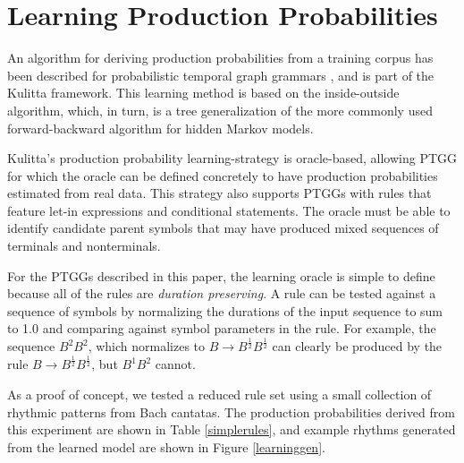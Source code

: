 \documentclass{article}
\begin{document}
\section{Learning Production Probabilities}

An algorithm for deriving production probabilities from a training corpus has been described for probabilistic temporal graph grammars \cite{kulitta_learning}, and is part of the Kulitta framework. This learning method is based on the inside-outside algorithm\cite{lari1990}, which, in turn, is a tree generalization of the more commonly used forward-backward algorithm for hidden Markov models.

Kulitta's production probability learning-strategy is oracle-based, allowing PTGG for which the oracle can be defined concretely to have production probabilities estimated from real data. This strategy also supports PTGGs with rules that feature let-in expressions and conditional statements. The oracle must be able to identify candidate parent symbols that may have produced mixed sequences of terminals and nonterminals. 

For the PTGGs described in this paper, the learning oracle is simple to define because all of the rules are \emph{duration preserving}. A rule can be tested against a sequence of symbols by normalizing the durations of the input sequence to sum to 1.0 and comparing against symbol parameters in the rule. For example, the sequence $B^{2}B^{2}$, which normalizes to $B \rightarrow B^\frac{1}{2} B^\frac{1}{2}$ can clearly be produced by the rule $B \rightarrow B^\frac{1}{2} B^\frac{1}{2}$, but $B^{1} B^{2}$ cannot. 

As a proof of concept, we tested a reduced rule set using a small collection of rhythmic patterns from Bach cantatas. The production probabilities derived from this experiment are shown in Table \ref{simplerules}, and example rhythms generated from the learned model are shown in Figure \ref{learninggen}.
\end{document}
